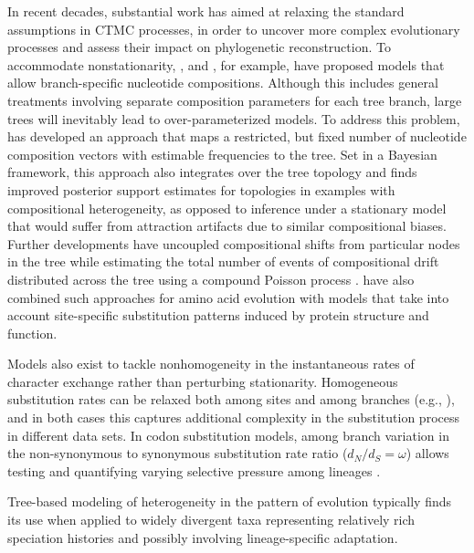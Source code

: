 In recent decades, substantial work has aimed at relaxing the standard assumptions in CTMC processes, in order to uncover more complex evolutionary processes and assess their impact on phylogenetic reconstruction. 
To accommodate nonstationarity, \citet{Yang1995}, \citet{Galtier1998} and \citet{Galtier1999}, for example, have proposed models that allow branch-specific nucleotide compositions.
Although this includes general treatments involving separate composition parameters for each tree branch, large trees will inevitably lead to over-parameterized models.
To address this problem, \citet{Foster2004} has developed an approach that maps a restricted, but fixed number of nucleotide composition vectors with estimable frequencies to the tree. 
Set in a Bayesian framework, this approach also integrates over the tree topology and finds improved posterior support estimates for topologies in examples with compositional heterogeneity, as opposed to inference under a stationary model that would suffer from attraction artifacts due to similar compositional biases. 
Further developments have uncoupled compositional shifts from particular nodes in the tree while estimating the total number of events of compositional drift distributed across the tree using a compound Poisson process \citep{Blanquart2006}. 
\cite{Blanquart2008} have also combined such approaches for amino acid evolution with models that take into account site-specific substitution patterns induced by protein structure and function.

Models also exist to tackle nonhomogeneity in the instantaneous rates of character exchange rather than perturbing stationarity.
Homogeneous substitution rates can be relaxed both among sites \citep{Huelsenbeck1999} and among branches (e.g., \citet{Foster12082009}), and in both cases this captures additional complexity in the substitution process in different data sets. 
In codon substitution models, among branch variation in the non-synonymous to synonymous substitution rate ratio ($d_N/d_S = \omega$) allows testing and quantifying varying selective pressure among lineages \citep{Yang1998}.

\par  %

Tree-based modeling of heterogeneity in the pattern of evolution typically finds its use when applied to widely divergent taxa representing relatively rich speciation histories and possibly involving lineage-specific adaptation.

